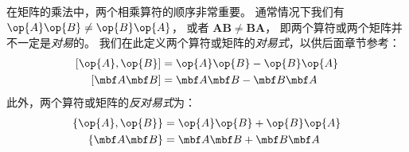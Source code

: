 在矩阵的乘法中，两个相乘算符的顺序非常重要。
通常情况下我们有 $\op{A}\op{B} \neq \op{B}\op{A}$，
或者 $\mathbf{A}\mathbf{B} \neq \mathbf{B}\mathbf{A}$，
即两个算符或两个矩阵并不一定是\emph{对易}的。
我们在此定义两个算符或矩阵的\emph{对易式}，以供后面章节参考：
\begin{subequations}
 \begin{align}
     \left[\op{A}, \op{B}\right] &= \op{A}\op{B} - \op{B}\op{A} \\
     \left[{\mbf A}{\mbf B}\right] &= {\mbf A}{\mbf B} - {\mbf B}{\mbf A}
 \end{align}
 \label{eq:1.18}
\end{subequations}
此外，两个算符或矩阵的\emph{反对易式}为：
\begin{subequations}
 \begin{align}
     \left\{\op{A},\op{B}\right\} &= \op{A}\op{B} + \op{B}\op{A}\label{eq:1.19a} \\
     \left\{{\mbf A}{\mbf B}\right\} &= {\mbf A}{\mbf B} + {\mbf B}{\mbf A}\label{eq:1.19b}
 \end{align}\label{eq:1.19}
\end{subequations}



